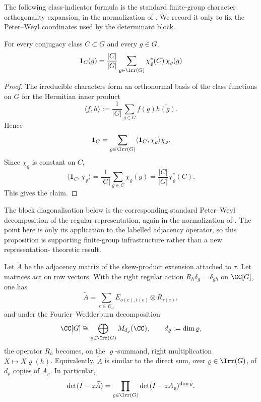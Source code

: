The following class-indicator formula is the standard finite-group character
orthogonality expansion, in the normalization of
\cite{Serre1977LinearRepresentations}.  We record it only to fix the
Peter--Weyl coordinates used by the determinant block.

\begin{proposition}
  \label{prop:class-indicator-expansion}
  For every conjugacy class \(C\subset G\) and every \(g\in G\),
  \[
    \mathbf 1_C(g)
    =\frac{|C|}{|G|}
      \sum_{\varrho\in\Irr(G)}
        \chi_\varrho^\ast(C)\,\chi_\varrho(g)
  \]
\end{proposition}

\begin{proof}
  The irreducible characters form an orthonormal basis of the class
  functions on \(G\) for the Hermitian inner product
  \[
    \langle f,h\rangle
    :=\frac{1}{|G|}\sum_{g\in G}f(g)\overline{h(g)}.
  \]
  Hence
  \[
    \mathbf 1_C
    =\sum_{\varrho\in\Irr(G)}
      \langle \mathbf 1_C,\chi_\varrho\rangle \chi_\varrho.
  \]
  Since \(\chi_\varrho\) is constant on \(C\),
  \[
    \langle \mathbf 1_C,\chi_\varrho\rangle
    =\frac{1}{|G|}\sum_{g\in C}\overline{\chi_\varrho(g)}
    =\frac{|C|}{|G|}\chi_\varrho^\ast(C).
  \]
  This gives the claim.
\end{proof}

The block diagonalisation below is the corresponding standard Peter--Weyl
decomposition of the regular representation, again in the normalization of
\cite{Serre1977LinearRepresentations}.  The point here is only its
application to the labelled adjacency operator, so this proposition is
supporting finite-group infrastructure rather than a new representation-
theoretic result.

\begin{proposition}
  \label{prop:kernel-peter-weyl-block-diagonalisation}
  Let \(\widetilde A\) be the adjacency matrix of the skew-product
  extension attached to \(\tau\). Let matrices act on row vectors. With
  the right regular action \(R_h\delta_g=\delta_{gh}\) on \(\CC[G]\), one
  has
  \[
    \widetilde A
    =
    \sum_{e\in E_A} E_{o(e),t(e)}\otimes R_{\tau(e)},
  \]
  and under the Fourier--Wedderburn decomposition
  \[
    \CC[G]\cong \bigoplus_{\varrho\in\Irr(G)}M_{d_\varrho}(\CC),
    \qquad d_\varrho:=\dim\varrho,
  \]
  the operator \(R_h\) becomes, on the \(\varrho\)-summand, right
  multiplication \(X\mapsto X\varrho(h)\). Equivalently, \(\widetilde A\)
  is similar to the direct sum, over \(\varrho\in\Irr(G)\), of
  \(d_\varrho\) copies of \(A_\varrho\). In particular,
  \[
    \det(I-z\widetilde A)
    =
    \prod_{\varrho\in\Irr(G)}
      \det(I-zA_\varrho)^{\dim\varrho}.
  \]
\end{proposition}

